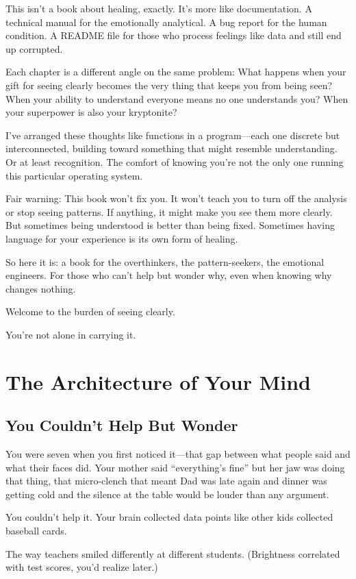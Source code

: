 \documentclass[12pt,letterpaper]{book}
\begin{document}
This isn't a book about healing, exactly. It's more like documentation. A technical manual for the emotionally analytical. A bug report for the human condition. A README file for those who process feelings like data and still end up corrupted.

Each chapter is a different angle on the same problem: What happens when your gift for seeing clearly becomes the very thing that keeps you from being seen? When your ability to understand everyone means no one understands you? When your superpower is also your kryptonite?

I've arranged these thoughts like functions in a program—each one discrete but interconnected, building toward something that might resemble understanding. Or at least recognition. The comfort of knowing you're not the only one running this particular operating system.

Fair warning: This book won't fix you. It won't teach you to turn off the analysis or stop seeing patterns. If anything, it might make you see them more clearly. But sometimes being understood is better than being fixed. Sometimes having language for your experience is its own form of healing.

So here it is: a book for the overthinkers, the pattern-seekers, the emotional engineers. For those who can't help but wonder why, even when knowing why changes nothing.

Welcome to the burden of seeing clearly.

You're not alone in carrying it.

\part{The Architecture of Your Mind}

\chapter{You Couldn't Help But Wonder}

You were seven when you first noticed it—that gap between what people said and what their faces did. Your mother said ``everything's fine'' but her jaw was doing that thing, that micro-clench that meant Dad was late again and dinner was getting cold and the silence at the table would be louder than any argument.

You couldn't help it. Your brain collected data points like other kids collected baseball cards.

The way teachers smiled differently at different students. (Brightness correlated with test scores, you'd realize later.)
\end{document}
